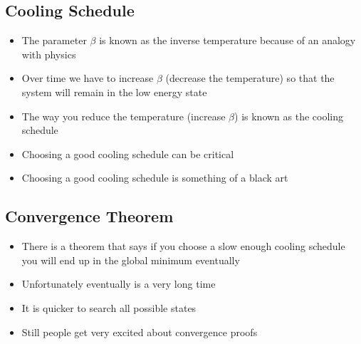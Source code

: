 \begin{slide}
\section{Cooling Schedule}

\begin{PauseHighLight}
  \begin{itemize}
  \item The parameter $\beta$ is known as the inverse temperature
    because of an analogy with physics\pause
  \item Over time we have to increase $\beta$ (decrease the temperature)
    so that the system will remain in the low energy state\pause
  \item The way you reduce the temperature (increase $\beta$) is known
    as the cooling schedule\pause
  \item Choosing a good cooling schedule can be critical\pause
  \item Choosing a good cooling schedule is something of a black
    art\pause
  \end{itemize}
\end{PauseHighLight}

\end{slide}


\begin{slide}
\section{Convergence Theorem}

\begin{PauseHighLight}
  \begin{itemize}
  \item There is a theorem that says if you choose a slow enough cooling
    schedule you will end up in the global minimum eventually\pause
  \item Unfortunately eventually is a very long time\pause
  \item It is quicker to search all possible states\pause
  \item Still people get very excited about convergence proofs\pause
  \end{itemize}
\end{PauseHighLight}

\end{slide}




